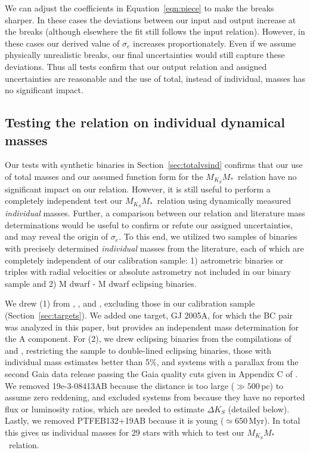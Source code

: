 \documentclass[twocolumn]{aastex62}
\newcommand{\mmk}{$M_{K_S}$\textendash$M_*$}
\begin{document}
We can adjust the coefficients in Equation~\ref{eqn:piece} to make the breaks sharper. In these cases the deviations between our input and output increase at the breaks (although elsewhere the fit still follows the input relation). However, in these cases our derived value of $\sigma_e$ increases proportionately. Even if we assume physically unrealistic breaks, our final uncertainties would still capture these deviations. Thus all tests confirm that our output relation and assigned uncertainties are reasonable and the use of total, instead of individual, masses has no significant impact. 

 \subsection{Testing the relation on individual dynamical masses}\label{sec:test}
 
Our tests with synthetic binaries in Section~\ref{sec:totalvsind} confirms that our use of total masses and our assumed function form for the \mmk\ relation have no significant impact on our relation. However, it is still useful to perform a completely independent test our \mmk\ relation using dynamically measured {\it individual} masses. Further, a comparison between our relation and literature mass determinations would be useful to confirm or refute our assigned uncertainties, and may reveal the origin of $\sigma_e$. To this end, we utilized two samples of binaries with precisely determined {\it individual} masses from the literature, each of which are completely independent of our calibration sample: 1) astrometric binaries or triples with radial velocities or absolute astrometry not included in our binary sample and 2) M dwarf - M dwarf eclipsing binaries.
  
We drew (1) from \citet{Hen1993}, \citet{Delfosse2000}, and \citet{Benedict2016}, excluding those in our calibration sample (Section~\ref{sec:targets}). We added one target, GJ 2005A, for which the BC pair was analyzed in this paper, but \citet{Sef2008} provides an independent mass determination for the A component. For (2), we drew eclipsing binaries from the compilations of \citet{Hartman2011} and \citet{Parsons2018}, restricting the sample to double-lined eclipsing binaries, those with individual mass estimates better than 5\%, and systems with a parallax from the second Gaia data release passing the Gaia quality cuts given in Appendix C of \citet{GaiaDr2}. We removed 19e-3-08413AB because the distance is too large ($\gg500$\,pc) to assume zero reddening, and excluded systems from \citet{Kraus2011} because they have no reported flux or luminosity ratios, which are needed to estimate $\Delta K_S$ (detailed below). Lastly, we removed PTFEB132+19AB \citep{2017ApJ...845...72K} because it is young ($\simeq$650\,Myr). In total this gives us individual masses for 29 stars with which to test our \mmk\ relation. 
\end{document}
